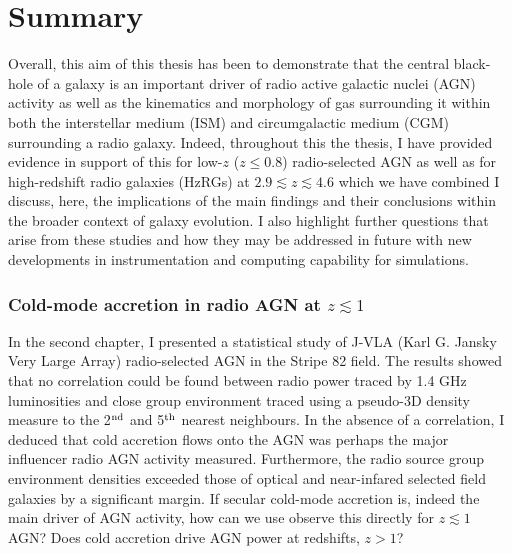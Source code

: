 \chapter[Summary]{Summary}

Overall, this aim of this thesis has been to demonstrate that the central black-hole of a galaxy is an important driver of radio active galactic nuclei (AGN) activity as well as the kinematics and morphology of gas surrounding it within both the interstellar medium (ISM) and circumgalactic medium (CGM) surrounding a radio galaxy. Indeed, throughout this the thesis, I have provided evidence in support of this for low-$z$ ($z \leq 0.8$) radio-selected AGN as well as for high-redshift radio galaxies (HzRGs) at $2.9 \lesssim z \lesssim 4.6$ which we have combined I discuss, here, the implications of the main findings and their conclusions within the broader context of galaxy evolution. I also highlight further questions that arise from these studies and how they may be addressed in future with new developments in instrumentation and computing capability for simulations. \\

\subsection{Cold-mode accretion in radio AGN at $z \lesssim 1$}

In the second chapter, I presented a statistical study of J-VLA (Karl G. Jansky Very Large Array) radio-selected AGN in the Stripe 82 field. The results showed that no correlation could be found between radio power traced by 1.4 GHz luminosities and close group environment traced using a pseudo-3D density measure to the 2$^{\rm nd}$ and 5$^{\rm th}$ nearest neighbours. In the absence of a correlation, I deduced that cold accretion flows onto the AGN was perhaps the major influencer radio AGN activity measured. Furthermore, the radio source group environment densities exceeded those of optical and near-infared selected field galaxies by a significant margin. If secular cold-mode accretion is, indeed the main driver of AGN activity, how can we use observe this directly for $z \lesssim 1$ AGN? Does cold accretion drive AGN power at redshifts, $z > 1$?\\

